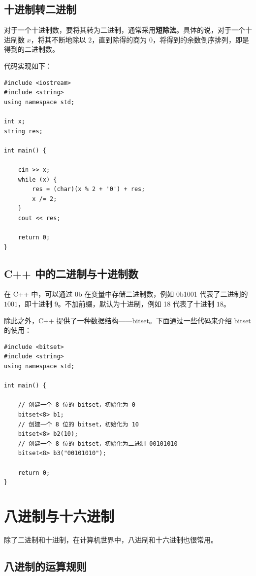 \subsection{十进制转二进制}

对于一个十进制数，要将其转为二进制，通常采用\textbf{短除法}。具体的说，对于一个十进制数 $x$，将其不断地除以 $2$，直到除得的商为 $0$，将得到的余数倒序排列，即是得到的二进制数。

代码实现如下：

\begin{lstlisting}[caption=十进制转二进制]
#include <iostream>
#include <string>
using namespace std;

int x;
string res;

int main() {
	
	cin >> x;
	while (x) {
		res = (char)(x % 2 + '0') + res;
		x /= 2;
	}
	cout << res;
	
	return 0;
}
\end{lstlisting}

\subsection{C++ 中的二进制与十进制数}

在 C++ 中，可以通过 0b 在变量中存储二进制数，例如 0b1001 代表了二进制的 $1001$，即十进制 $9$。不加前缀，默认为十进制，例如 18 代表了十进制 $18$。

除此之外，C++ 提供了一种数据结构——bitset。下面通过一些代码来介绍 bitset 的使用：

\begin{lstlisting}[caption=bitset 的使用]
#include <bitset>
#include <string>
using namespace std;

int main() {
	
	// 创建一个 8 位的 bitset，初始化为 0
	bitset<8> b1;
	// 创建一个 8 位的 bitset，初始化为 10
	bitset<8> b2(10);
	// 创建一个 8 位的 bitset，初始化为二进制 00101010
	bitset<8> b3("00101010");
	
	return 0;
}
\end{lstlisting}

\section{八进制与十六进制}

除了二进制和十进制，在计算机世界中，八进制和十六进制也很常用。

\subsection{八进制的运算规则}

